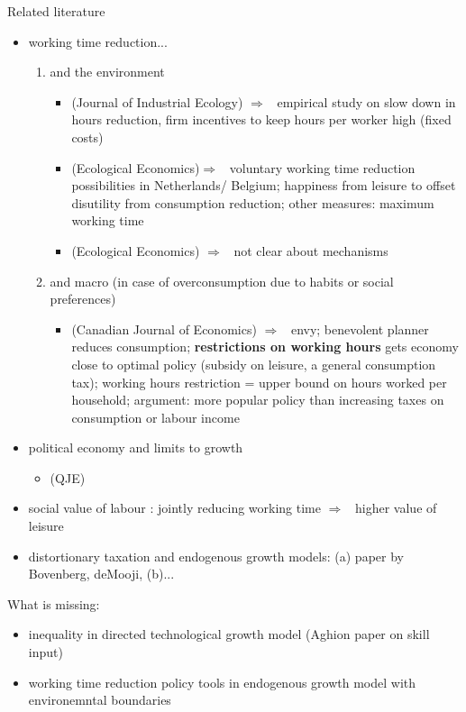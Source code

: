 \documentclass[11pt,aspectratio=169]{beamer}
\newcommand{\ar}{$\Rightarrow$ \ }
\begin{document}
\begin{frame}[allowframebreaks]{Related literature}
\begin{itemize}
\begin{enumerate}
\begin{itemize}
\end{itemize}
\end{enumerate}
\item working time reduction...
\begin{enumerate}
\item and the environment
\begin{itemize}
\item \cite{Schor2005SustainableReduction}(Journal of Industrial Ecology) \ar empirical study on slow down in hours reduction, firm incentives to keep hours per worker high (fixed costs)
\item \cite{Pullinger2014WorkingDesign}(Ecological Economics)\ar voluntary working time reduction possibilities in Netherlands/ Belgium; happiness from leisure to  offset disutility from consumption reduction; other measures: maximum working time
\item \cite{Cieplinski2021EnvironmentalReductionb}(Ecological Economics) \ar not clear about mechanisms
\end{itemize}
\item and macro (in case of overconsumption due to habits or social preferences)
\begin{itemize}
\item \cite{Alvarez-Cuadrado2007EnvyHours}(Canadian Journal of Economics) \ar envy; benevolent planner reduces consumption; \textbf{restrictions on working hours} gets economy close to optimal policy (subsidy on leisure, a general consumption tax); working hours restriction = upper bound on hours worked per household; argument: more popular policy than increasing taxes on consumption or labour income
\end{itemize}
\end{enumerate}
\item political economy and limits to growth
\begin{itemize}
\item \cite{Alesina1994DistributiveGrowth}(QJE)
\end{itemize}
\item social value of labour  \citep{Alesina2005WorkDifferent}: jointly reducing working time \ar higher value of leisure
\item distortionary taxation and endogenous growth models: (a) paper by Bovenberg, deMooji, (b)...
\end{itemize}
What is missing: 
\begin{itemize}
\item inequality in directed technological growth model (Aghion paper on skill input)
\item working time reduction policy tools in endogenous growth model with environemntal boundaries
\end{itemize}
\end{frame}
\end{document}
